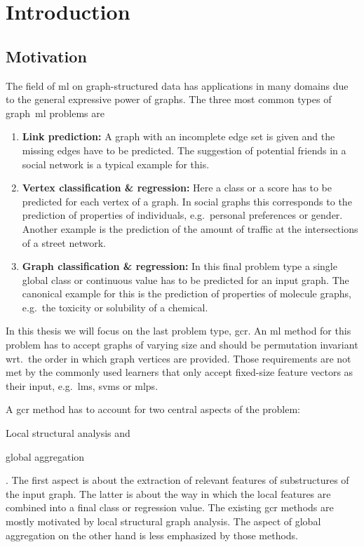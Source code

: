\chapter{Introduction}%
\label{sec:intro}

\setcounter{page}{1}			%

\section{Motivation}%
\label{sec:intro:motivation}

The field of \ac{ml} on graph-structured data has applications in many domains due to the general expressive power of graphs.
The three most common types of graph~\ac{ml} problems are
\begin{enumerate}[label=\textbf{\arabic*.}]
	\item \textbf{Link prediction:}
		A graph with an incomplete edge set is given and the missing edges have to be predicted.
		The suggestion of potential friends in a social network is a typical example for this.
	\item \textbf{Vertex classification \& regression:}
		Here a class or a score has to be predicted for each vertex of a graph.
		In social graphs this corresponds to the prediction of properties of individuals, e.g.\ personal preferences or gender.
		Another example is the prediction of the amount of traffic at the intersections of a street network.
	\item \textbf{Graph classification \& regression:}
		In this final problem type a single global class or continuous value has to be predicted for an input graph.
		The canonical example for this is the prediction of properties of molecule graphs, e.g.\ the toxicity or solubility of a chemical.
\end{enumerate}
In this thesis we will focus on the last problem type, \ac{gcr}.
An \ac{ml} method for this problem has to accept graphs of varying size and should be permutation invariant wrt.\ the order in which graph vertices are provided.
Those requirements are not met by the commonly used learners that only accept fixed-size feature vectors as their input, e.g.\ \acp{lm}, \acp{svm} or \acp{mlp}.

A \ac{gcr} method has to account for two central aspects of the problem:
\begin{enumerate*}
	\item Local structural analysis and
	\item global aggregation
\end{enumerate*}.
The first aspect is about the extraction of relevant features of substructures of the input graph.
The latter is about the way in which the local features are combined into a final class or regression value.
The existing \ac{gcr} methods are mostly motivated by local structural graph analysis.
The aspect of global aggregation on the other hand is less emphasized by those methods.

